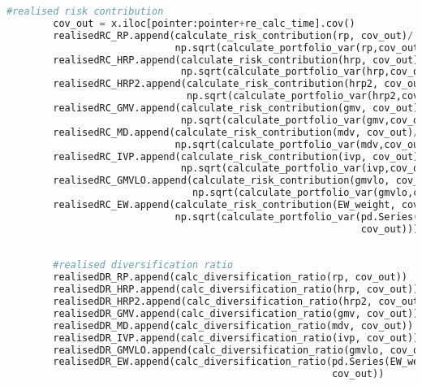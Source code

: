 \begin{lstlisting}[language=Python]
        #realised risk contribution
        cov_out = x.iloc[pointer:pointer+re_calc_time].cov()
        realisedRC_RP.append(calculate_risk_contribution(rp, cov_out)/
                             np.sqrt(calculate_portfolio_var(rp,cov_out)))
        realisedRC_HRP.append(calculate_risk_contribution(hrp, cov_out)/
                              np.sqrt(calculate_portfolio_var(hrp,cov_out)))
        realisedRC_HRP2.append(calculate_risk_contribution(hrp2, cov_out)/
                               np.sqrt(calculate_portfolio_var(hrp2,cov_out)))
        realisedRC_GMV.append(calculate_risk_contribution(gmv, cov_out)/
                              np.sqrt(calculate_portfolio_var(gmv,cov_out)))
        realisedRC_MD.append(calculate_risk_contribution(mdv, cov_out)/
                             np.sqrt(calculate_portfolio_var(mdv,cov_out)))
        realisedRC_IVP.append(calculate_risk_contribution(ivp, cov_out)/
                              np.sqrt(calculate_portfolio_var(ivp,cov_out)))
        realisedRC_GMVLO.append(calculate_risk_contribution(gmvlo, cov_out)/
                                np.sqrt(calculate_portfolio_var(gmvlo,cov_out)))
        realisedRC_EW.append(calculate_risk_contribution(EW_weight, cov_out)/
                             np.sqrt(calculate_portfolio_var(pd.Series(EW_weight),
                                                             cov_out)))
        
        
        #realised diversification ratio
        realisedDR_RP.append(calc_diversification_ratio(rp, cov_out))
        realisedDR_HRP.append(calc_diversification_ratio(hrp, cov_out))
        realisedDR_HRP2.append(calc_diversification_ratio(hrp2, cov_out))
        realisedDR_GMV.append(calc_diversification_ratio(gmv, cov_out))
        realisedDR_MD.append(calc_diversification_ratio(mdv, cov_out))
        realisedDR_IVP.append(calc_diversification_ratio(ivp, cov_out))
        realisedDR_GMVLO.append(calc_diversification_ratio(gmvlo, cov_out))
        realisedDR_EW.append(calc_diversification_ratio(pd.Series(EW_weight),
                                                        cov_out))
        

\end{lstlisting}
